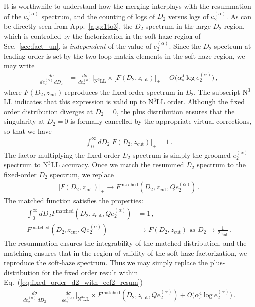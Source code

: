 \documentclass[a4paper,11pt]{article}
\newcommand{\ecf}[2]{e_{#1}^{(#2)}}
\def\log{\text{log}}
\def\zcut{z_{\text{cut}}}
\DeclareRobustCommand{\Sec}[1]{Sec.~\ref{#1}}
\DeclareRobustCommand{\App}[1]{App.~\ref{#1}}
\DeclareRobustCommand{\Eq}[1]{Eq.~(\ref{#1})}
\begin{document}
It is worthwhile to understand how the merging interplays with the resummation of the $\ecf{2}{\alpha}$ spectrum, and the counting of logs of $D_2$ versus logs of $\ecf{2}{\alpha}$. As can be directly seen from \App{app:1to3}, the $D_2$ spectrum in the large $D_2$ region, which is controlled by the factorization in the soft-haze region of \Sec{sec:fact_un}, is \emph{independent} of the value of $\ecf{2}{\alpha}$. Since the $D_2$ spectrum at leading order is set by the two-loop matrix elements in the soft-haze region, we may write
\begin{align}\label{eq:fixed_order_d2_with_ecf2_resum}
\frac{d\sigma}{d\ecf{2}{\alpha}\,dD_2}&=\frac{d\sigma}{d\ecf{2}{\alpha}}\Bigg|_{\text{N}^3\text{LL}}\times\big[F(D_2,\zcut)\big]_++O\Big(\alpha_s^4~\log~\ecf{2}{\alpha}\Big)\,,
\end{align}
where $F(D_2,\zcut)$ reproduces the fixed order spectrum in $D_2$. The subscript N$^3$LL indicates that this expression is valid up to N$^3$LL order. Although the fixed order distribution diverges at $D_2=0$, the plus distribution ensures that the singularity at $D_2=0$ is formally cancelled by the appropriate virtual corrections, so that we have
\begin{align}
\int_0^{\infty}dD_2\big[F(D_2,\zcut)\big]_+=1\,.
\end{align}
The factor multiplying the fixed order $D_2$ spectrum is simply the groomed $\ecf{2}{\alpha}$ spectrum to N$^3$LL accuracy. Once we match the resummed $D_2$ spectrum to the fixed-order $D_2$ spectrum, we replace
\begin{align}
\big[F(D_2,\zcut)\big]_+\rightarrow F^{\text{matched}}(D_2,\zcut,Q\ecf{2}{\alpha})\,.
\end{align}
The matched function satisfies the properties:
\begin{align}
\int_0^{\infty}dD_2F^{\text{matched}}(D_2,\zcut,Q\ecf{2}{\alpha})&=1\,,\\
F^{\text{matched}}(D_2,\zcut,Q\ecf{2}{\alpha})&\rightarrow F(D_2,\zcut)\text{ as } D_2 \rightarrow \frac{1}{2\zcut}\,.
\end{align}
The resummation ensures the integrability of the matched distribution, and the matching ensures that in the region of validity of the soft-haze factorization, we reproduce the soft-haze spectrum. Thus we may simply replace the plus-distribution for the fixed order result within \Eq{eq:fixed_order_d2_with_ecf2_resum}
\begin{align}\label{eq:fixed_order_d2_with_ecf2_resum_II}
\frac{d\sigma}{d\ecf{2}{\alpha}\,dD_2}&=\frac{d\sigma}{d\ecf{2}{\alpha}}\Bigg|_{\text{N}^3\text{LL}}\times F^{\text{matched}}(D_2,\zcut,Q\ecf{2}{\alpha})+O\Big(\alpha_s^4~\log~\ecf{2}{\alpha}\Big)\,.
\end{align}
\end{document}
